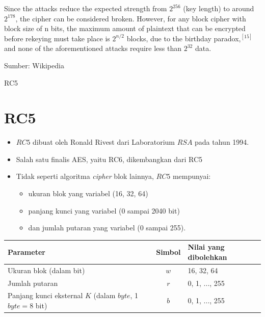 \documentclass{article}
\begin{document}
Since the attacks reduce the expected strength from $2^{256}$ (key length) to around $2^{178}$, the cipher can be considered broken. However, for any block cipher with block size of n bits, the maximum amount of plaintext that can be encrypted before rekeying must take place is $2^{n/2}$ blocks, due to the birthday paradox,$^{[15]}$ and none of the aforementioned attacks require less than $2^{32}$ data.

\begin{flushright}
Sumber: Wikipedia
\end{flushright}

\newpage


RC5

\newpage


\section*{RC5}

\begin{itemize}
    \item $RC5$ dibuat oleh Ronald Rivest dari Laboratorium $RSA$ pada tahun 1994.
    \item Salah satu finalis AES, yaitu RC6, dikembangkan dari RC5
\end{itemize}

\begin{itemize}
    \item Tidak seperti algoritma \textit{cipher} blok lainnya, $RC5$ mempunyai:
    \begin{itemize}
        \item ukuran blok yang variabel (16, 32, 64)
        \item panjang kunci yang variabel (0 sampai 2040 bit)
        \item dan jumlah putaran yang variabel (0 sampai 255).
    \end{itemize}
\end{itemize}

\vspace{5mm}

\begin{tabular}{|l|c|l|}
\hline
\textbf{Parameter} & \textbf{Simbol} & \textbf{Nilai yang dibolehkan} \\ \hline
Ukuran blok (dalam bit) & $w$ & 16, 32, 64 \\ \hline
Jumlah putaran & $r$ & 0, 1, ..., 255 \\ \hline
Panjang kunci eksternal $K$ (dalam $byte$, 1 $byte = 8$ bit) & $b$ & 0, 1, ..., 255 \\ \hline
\end{tabular}
\end{document}
